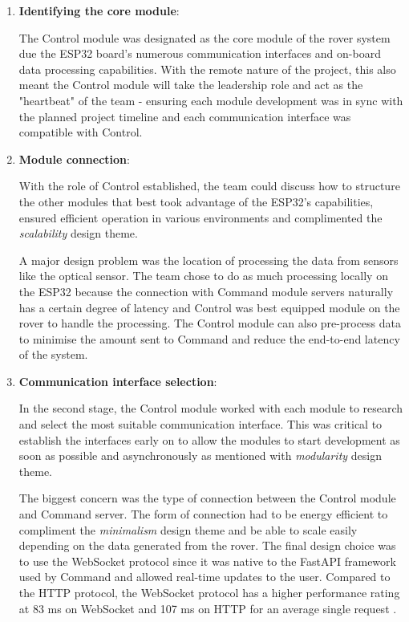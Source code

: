 \documentclass[11pt, a4paper]{article}
\begin{document}
\begin{enumerate}

    \item \textbf{Identifying the core module}: 
    
    The Control module was designated as the core module of the rover system due the ESP32 board's numerous communication interfaces and on-board data processing capabilities. With the remote nature of the project, this also meant the Control module will take the leadership role and act as the "heartbeat" of the team - ensuring each module development was in sync with the planned project timeline and each communication interface was compatible with Control.   

    \item \textbf{Module connection}:
    
    With the role of Control established, the team could discuss how to structure the other modules that best took advantage of the ESP32's capabilities, ensured efficient operation in various environments and complimented the \textit{scalability} design theme. 

    A major design problem was the location of processing the data from sensors like the optical sensor. The team chose to do as much processing locally on the ESP32 because the connection with Command module servers naturally has a certain degree of latency and Control was best equipped module on the rover to handle the processing. The Control module can also pre-process data to minimise the amount sent to Command and reduce the end-to-end latency of the system.
    
    \item \textbf{Communication interface selection}: 
    
    In the second stage, the Control module worked with each module to research and select the most suitable communication interface. This was critical to establish the interfaces early on to allow the modules to start development as soon as possible and asynchronously as mentioned with \textit{modularity} design theme. 

    The biggest concern was the type of connection between the Control module and Command server. The form of connection had to be energy efficient to compliment the \textit{minimalism} design theme and be able to scale easily depending on the data generated from the rover. The final design choice was to use the WebSocket protocol since it was native to the FastAPI framework used by Command and allowed real-time updates to the user. Compared to the HTTP protocol, the WebSocket protocol has a higher performance rating at 83 ms on WebSocket and 107 ms on HTTP for an average single request \cite{SocketvsHTTP}.  

\end{enumerate}  
\end{document}

